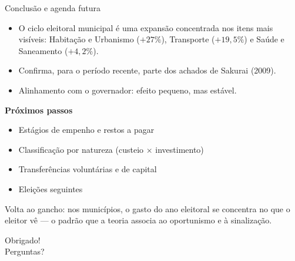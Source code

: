 \documentclass[aspectratio=169,9pt]{beamer}
\begin{document}
\begin{frame}{Conclusão e agenda futura}
  \begin{itemize}
    \item O ciclo eleitoral municipal é uma \alert{expansão concentrada nos itens mais visíveis}: Habitação e Urbanismo ($+27\%$), Transporte ($+19{,}5\%$) e Saúde e Saneamento ($+4{,}2\%$).
    \item Confirma, para o período recente, parte dos achados de Sakurai (2009).
    \item Alinhamento com o governador: efeito pequeno, mas estável.
  \end{itemize}
  \vspace{0.5em}
  \textbf{Próximos passos}
  \begin{itemize}
    \item Estágios de empenho e restos a pagar
    \item Classificação por natureza (custeio $\times$ investimento)
    \item Transferências voluntárias e de capital
    \item Eleições seguintes
  \end{itemize}
  \vspace{0.5em}
  \alert{Volta ao gancho:} nos municípios, o gasto do ano eleitoral se concentra no que o eleitor vê --- o padrão que a teoria associa ao oportunismo e à sinalização.
\end{frame}

\begin{frame}
  \vfill
  \begin{center}
    {\Huge Obrigado!}\\[1em]
    {\Large Perguntas?}
  \end{center}
  \vfill
\end{frame}

\appendix
\end{document}
